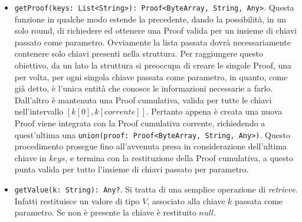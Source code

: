 \begin{itemize}
		\item \verb!getProof(keys: List<String>): Proof<ByteArray, String, Any>!. Questa funzione in qualche modo estende la precedente, dando la possibilità, in un solo round, di richiedere ed ottenere una Proof valida per un insieme di chiavi passato come parametro. Ovviamente la lista passata dovrà necessariamente contenere solo chiavi presenti nella struttura.
		Per raggiungere questo obiettivo, da un lato la struttura si preoccupa di creare le singole Proof, una per volta, per ogni singola chiave passata come parametro, in quanto, come già detto, è l'unica entità che conosce le informazioni necessarie a farlo. Dall'altro è mantenuta una Proof cumulativa, valida per tutte le chiavi nell'intervallo $ [k[0], k[corrente]] $. Pertanto appena è creata una nuova Proof viene integrata con la Proof cumulativa corrente, richiedendo a quest'ultima una \verb!union(proof: Proof<ByteArray, String, Any>)!. Questo procedimento prosegue fino all'avvenuta presa in considerazione dell'ultima chiave in $ keys $, e termina con la restituzione della Proof cumulativa, a questo punta valida per tutto l'insieme di chiavi passato per parametro.
		
		\item \verb!getValue(k: String): Any?!. Si tratta di una semplice operazione di \textit{retrieve}. Infatti restituisce un valore di tipo $ V $, associato alla chiave $ k $ passata come parametro. Se non è presente la chiave è restituito $ null $.
		

\end{itemize}
